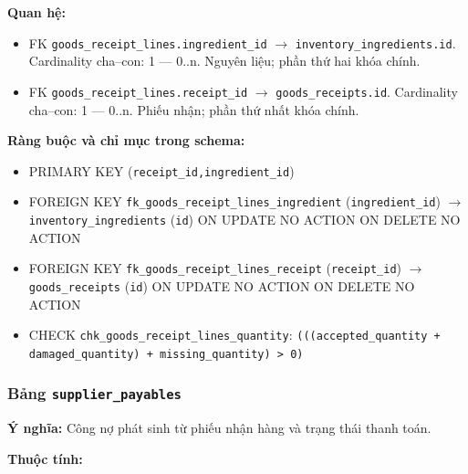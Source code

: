 \textbf{Quan hệ:}

\begin{itemize}

\item FK \texttt{goods\_receipt\_lines.ingredient\_id} $\rightarrow$ \texttt{inventory\_ingredients.id}. Cardinality cha--con: 1 — 0..n. Nguyên liệu; phần thứ hai khóa chính.

\item FK \texttt{goods\_receipt\_lines.receipt\_id} $\rightarrow$ \texttt{goods\_receipts.id}. Cardinality cha--con: 1 — 0..n. Phiếu nhận; phần thứ nhất khóa chính.

\end{itemize}

\textbf{Ràng buộc và chỉ mục trong schema:}

\begin{itemize}

\item PRIMARY KEY (\texttt{receipt\_id,ingredient\_id})

\item FOREIGN KEY \texttt{fk\_goods\_receipt\_lines\_ingredient} (\texttt{ingredient\_id}) $\rightarrow$ \texttt{inventory\_ingredients} (\texttt{id}) ON UPDATE NO ACTION ON DELETE NO ACTION

\item FOREIGN KEY \texttt{fk\_goods\_receipt\_lines\_receipt} (\texttt{receipt\_id}) $\rightarrow$ \texttt{goods\_receipts} (\texttt{id}) ON UPDATE NO ACTION ON DELETE NO ACTION

\item CHECK \texttt{chk\_goods\_receipt\_lines\_quantity}: \texttt{(((accepted\_quantity + damaged\_quantity) + missing\_quantity) > 0)}

\end{itemize}

\subsubsection{Bảng \texttt{supplier\_payables}}

\textbf{Ý nghĩa:} Công nợ phát sinh từ phiếu nhận hàng và trạng thái thanh toán.\par

\textbf{Thuộc tính:}

